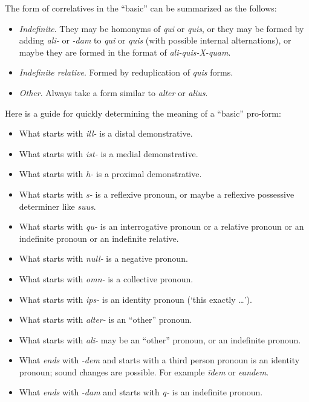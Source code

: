 \documentclass[a4paper, oneside, 12pt]{report}
\newcommand{\form}[1]{\emph{#1}}
\newcommand{\translate}[1]{`#1'}
\begin{document}
The form of correlatives in the ``basic'' can be summarized as the follows:
\begin{itemize}
    \item \emph{Indefinite}. They may be homonyms of \form{qui} or \form{quis},
    or they may be formed by adding \form{ali-} or \form{-dam} to \form{qui} or \form{quis}
    (with possible internal alternations), 
    or maybe they are formed in the format of \form{ali-quis-X-quam}.
    \item \emph{Indefinite relative}. Formed by reduplication of \form{quis} forms.
    \item \emph{Other}. Always take a form similar to \form{alter} or \form{alius}.  
\end{itemize}

Here is a guide for quickly determining the meaning of a ``basic'' pro-form:
\begin{itemize}
    \item What starts with \form{ill-} is a distal demonstrative.
    \item What starts with \form{ist-} is a medial demonstrative.
    \item What starts with \form{h-} is a proximal demonstrative.
    \item What starts with \form{s-} is a reflexive pronoun, 
    or maybe a reflexive possessive determiner like \form{suus}.
    \item What starts with \form{qu-} is an interrogative pronoun 
    or a relative pronoun or an indefinite pronoun 
    or an indefinite relative.
    \item What starts with \form{null-} is a negative pronoun.
    \item What starts with \form{omn-} is a collective pronoun.
    \item What starts with \form{ips-} is an identity pronoun (\translate{this exactly \dots}).
    \item What starts with \form{alter-} is an ``other'' pronoun.
    \item What starts with \form{ali-} may be an ``other'' pronoun, or an indefinite pronoun.
    \item What \emph{ends} with \form{-dem} and starts with a third person pronoun
        is an identity pronoun; sound changes are possible. 
        For example \form{īdem} or \form{eandem}. 
    \item What \emph{ends} with \form{-dam} and starts with \form{q-} is an indefinite pronoun.
\end{itemize} 
\end{document}
